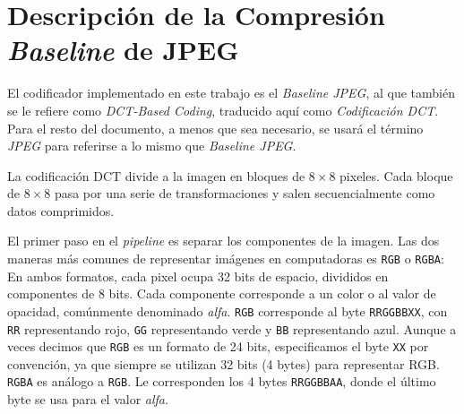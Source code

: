 \section{Descripción de la Compresión \emph{Baseline} de JPEG}

El codificador implementado en este trabajo es el \emph{Baseline JPEG}, al que
también se le refiere como \emph{DCT-Based Coding}, traducido aquí como
\emph{Codificación DCT}. Para el resto del documento, a menos que sea
necesario, se usará el término \emph{JPEG} para referirse a lo mismo que
\emph{Baseline JPEG}.

La codificación DCT divide a la imagen en bloques de $8\times8$ pixeles. Cada
bloque de $8\times8$ pasa por una serie de transformaciones y salen
secuencialmente como datos comprimidos.

El primer paso en el \emph{pipeline} es separar los componentes de la imagen.
Las dos maneras más comunes de representar imágenes en computadoras es
\verb+RGB+ o \verb+RGBA+: En ambos formatos, cada pixel ocupa 32 bits de
espacio, divididos en componentes de 8 bits. Cada componente corresponde a un
color o al valor de opacidad, comúnmente denominado \emph{alfa}. \verb+RGB+
corresponde al byte \verb+RRGGBBXX+, con \verb+RR+ representando rojo,
\verb+GG+ representando verde y \verb+BB+ representando azul. Aunque a veces
decimos que \verb+RGB+ es un formato de 24 bits, especificamos el byte
\verb+XX+ por convención, ya que siempre se utilizan 32 bits (4 bytes) para
representar RGB. \verb+RGBA+ es análogo a \verb+RGB+. Le corresponden los 4
bytes \verb+RRGGBBAA+, donde el último byte se usa para el valor \emph{alfa}.





